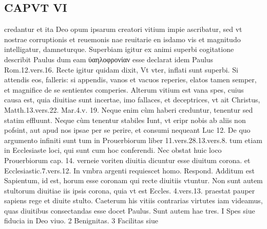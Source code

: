 \documentclass{article}
\begin{document}
\begin{pages}
\section*{CAPVT  VI }
\marginpar{[ p.497 ]}\pstart credantur et ita Deo opum ipsarum creatori vitium impie ascribatur, sed vt nostrae corruptionis et reuemonis nae reuitarie en isdamo vis et magnitudo intelligatur, damneturque.  \pend\pstart Superbiam igitur ex animi superbi cogitatione describit Paulus dum eam ὐαηλοφρονίαν esse declarat idem Paulus Rom.12.vers.16. Recte igitur quidam dixit, Vt vter, inflati sunt superbi. Si attendis eos, falleris: si appendis, vanos et vacuos reperies, elatos tamen semper, et magnifice de se sentientes comperies.  \pend\pstart Alterum vitium est vana spes, cuius causa est, quia diuitiae sunt incertae, imo fallaces, et deceptrices, vt ait Christus, Matth.13.vers.22. Mar.4.v. 19. Neque enim cùm haberi creduntur, tenentur sed statim effluunt. Neque cùm tenentur stabiles Iunt, vt eripr nobis ab aliis non pofsint, aut apud nos ipsae per se perire, et consumi nequeant Luc 12. De quo argumento infiniti sunt tum in Prouerbiorum liber  11.vers.28.13.vers.8. tum etiam in Ecclesiaste loci, qui sunt cum hoc conferendi.  \pend\pstart Nec obstat huic loco Prouerbiorum cap. 14. verneie voriten diuitia dicuntur esse diuitum corona. et Ecclesiastic.7.vers.12. In vmbra argenti requiescet homo. Respond. Additum est Sapientum, id est, horum esse coronam qui recte diuitiis vtuntur. Non sunt autem stultorum diuitiae iis ipsis corona, quia vt est Eccles. 4.vers.13. praestat pauper sapiens rege et diuite stulto.  \pend\pstart Caeterum his vitiis contrarias virtutes iam videamus, quas diuitibus consectandas esse docet Paulus. Sunt autem hae tres. I Spes siue fiducia in Deo viuo. 2 Benignitas. 3 Facilitas siue  \pend

\end{pages}
\end{document}
